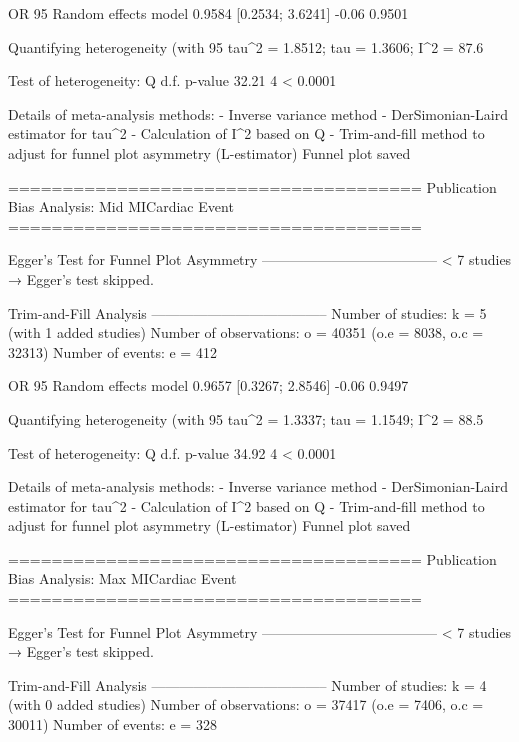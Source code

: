                          OR           95%
Random effects model 0.9584 [0.2534; 3.6241] -0.06  0.9501

Quantifying heterogeneity (with 95%
 tau^2 = 1.8512; tau = 1.3606; I^2 = 87.6%

Test of heterogeneity:
     Q d.f.  p-value
 32.21    4 < 0.0001

Details of meta-analysis methods:
- Inverse variance method
- DerSimonian-Laird estimator for tau^2
- Calculation of I^2 based on Q
- Trim-and-fill method to adjust for funnel plot asymmetry (L-estimator)
  Funnel plot saved

======================================
Publication Bias Analysis: Mid MICardiac Event 
======================================
                                                                                                                                                        
Egger's Test for Funnel Plot Asymmetry
--------------------------------------
  < 7 studies → Egger’s test skipped.

Trim-and-Fill Analysis
--------------------------------------
Number of studies: k = 5 (with 1 added studies)
Number of observations: o = 40351 (o.e = 8038, o.c = 32313)
Number of events: e = 412

                         OR           95%
Random effects model 0.9657 [0.3267; 2.8546] -0.06  0.9497

Quantifying heterogeneity (with 95%
 tau^2 = 1.3337; tau = 1.1549; I^2 = 88.5%

Test of heterogeneity:
     Q d.f.  p-value
 34.92    4 < 0.0001

Details of meta-analysis methods:
- Inverse variance method
- DerSimonian-Laird estimator for tau^2
- Calculation of I^2 based on Q
- Trim-and-fill method to adjust for funnel plot asymmetry (L-estimator)
  Funnel plot saved

======================================
Publication Bias Analysis: Max MICardiac Event 
======================================
                                                                                                                                                        
Egger's Test for Funnel Plot Asymmetry
--------------------------------------
  < 7 studies → Egger’s test skipped.

Trim-and-Fill Analysis
--------------------------------------
Number of studies: k = 4 (with 0 added studies)
Number of observations: o = 37417 (o.e = 7406, o.c = 30011)
Number of events: e = 328

